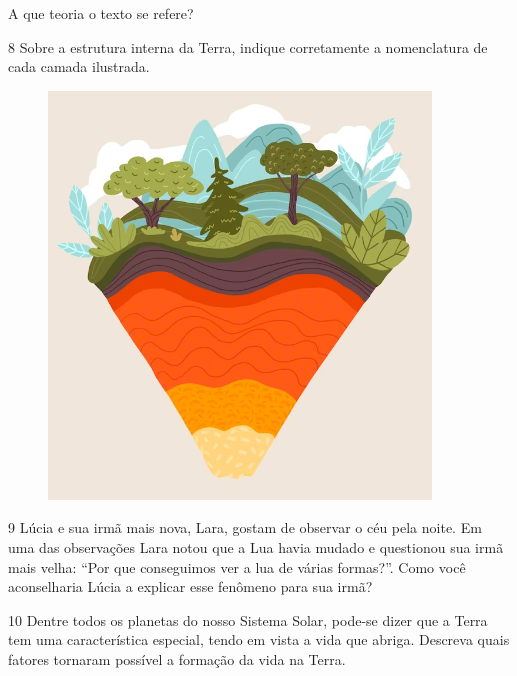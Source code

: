 A que teoria o texto se refere?



\num{8} Sobre a estrutura interna da Terra, indique corretamente a nomenclatura de cada camada ilustrada.

\begin{figure}[htpb!]
\centering
\includegraphics[width=.5\textwidth]{./imgs/img11.png}
\end{figure}



\num{9}  Lúcia e sua irmã mais nova, Lara, gostam de observar o céu pela noite.
  Em uma das observações Lara notou que a Lua havia mudado e questionou
  sua irmã mais velha: ``Por que conseguimos ver a lua de várias
  formas?''. Como você aconselharia Lúcia a explicar esse fenômeno para sua irmã?



\num{10}  Dentre todos os planetas do nosso Sistema Solar, pode-se dizer que a
  Terra tem uma característica especial, tendo em vista a vida que
  abriga. Descreva quais fatores tornaram possível a formação da vida na Terra.



